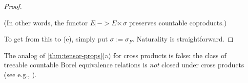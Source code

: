 \documentclass[11pt]{article}
\begin{document}
\begin{proof}
\begin{proposition}
(In other words, the functor $E |-> E \ltimes \sigma$ preserves countable coproducts.)
\end{proposition}
To get from this to (e), simply put $\sigma := \sigma_F$.  Naturality is straightforward.
% 
\end{proof}

\begin{remark}
The analog of \cref{thm:tensor-props}(a) for cross products is false: the class of treeable countable Borel equivalence relations is \emph{not} closed under cross products (see e.g., \cite[3.28]{JKL}).
\end{remark}
\end{document}
